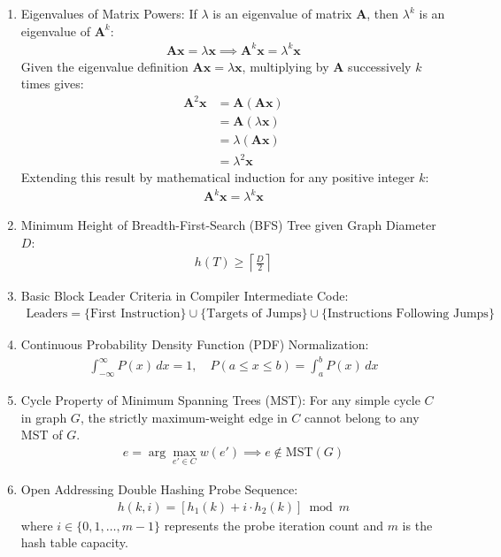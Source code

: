 \begin{enumerate}[label=\thesubsection.\arabic*, ref=\thesubsection.\theenumi]
\item Eigenvalues of Matrix Powers:
If $\lambda$ is an eigenvalue of matrix $\mathbf{A}$, then $\lambda^k$ is an eigenvalue of $\mathbf{A}^k$:
\begin{align}
\mathbf{A}\mathbf{x} = \lambda \mathbf{x} \implies \mathbf{A}^k \mathbf{x} = \lambda^k \mathbf{x} \label{eq:CS12025-eigenvalue_power}
\end{align}
\solution
Given the eigenvalue definition $\mathbf{A}\mathbf{x} = \lambda \mathbf{x}$, multiplying by $\mathbf{A}$ successively $k$ times gives:
\begin{align}
\mathbf{A}^2 \mathbf{x} &= \mathbf{A}(\mathbf{A}\mathbf{x}) \\
                        &= \mathbf{A}(\lambda \mathbf{x}) \\
                        &= \lambda (\mathbf{A}\mathbf{x}) \\
                        &= \lambda^2 \mathbf{x}
\end{align}
Extending this result by mathematical induction for any positive integer $k$:
\begin{align}
\mathbf{A}^k \mathbf{x} = \lambda^k \mathbf{x}
\end{align}

\item Minimum Height of Breadth-First-Search (BFS) Tree given Graph Diameter $D$:
\begin{align}
h(T) \ge \left\lceil \frac{D}{2} \right\rceil \label{eq:CS12025-bfs_tree_height}
\end{align}

\item Basic Block Leader Criteria in Compiler Intermediate Code:
\begin{align}
\text{Leaders} = \{\text{First Instruction}\} \cup \{\text{Targets of Jumps}\} \cup \{\text{Instructions Following Jumps}\} \label{eq:CS12025-basic_block_leaders}
\end{align}

\item Continuous Probability Density Function (PDF) Normalization:
\begin{align}
\int_{-\infty}^{\infty} P(x) \, dx = 1, \quad P(a \le x \le b) = \int_a^b P(x) \, dx \label{eq:CS12025-pdf_normalization}
\end{align}

\item Cycle Property of Minimum Spanning Trees (MST):
For any simple cycle $C$ in graph $G$, the strictly maximum-weight edge in $C$ cannot belong to any MST of $G$.
\begin{align}
e = \arg\max_{e' \in C} w(e') \implies e \notin \text{MST}(G) \label{eq:CS12025-mst_cycle_property}
\end{align}

\item Open Addressing Double Hashing Probe Sequence:
\begin{align}
h(k, i) = \left[ h_1(k) + i \cdot h_2(k) \right] \bmod m \label{eq:CS12025-double_hashing}
\end{align}
where $i \in \{0, 1, \dots, m-1\}$ represents the probe iteration count and $m$ is the hash table capacity.

\end{enumerate}
